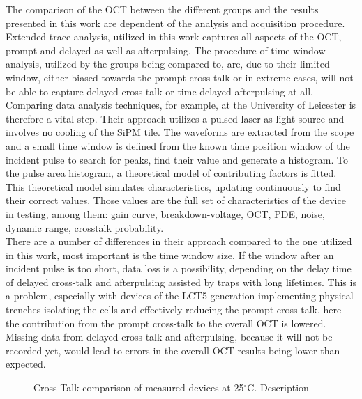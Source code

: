 \documentclass[12pt,article,type=msc,colorback,accentcolor=tud9c]{tudthesis}
\begin{document}
The comparison of the OCT between the different groups and the results presented in this work are dependent of the analysis and acquisition procedure. Extended trace analysis, utilized in this work captures all aspects of the OCT, prompt and delayed as well as afterpulsing. The procedure of time window analysis, utilized by the groups being compared to, are, due to their limited window, either biased towards the prompt cross talk or in extreme cases, will not be able to capture delayed cross talk or time-delayed afterpulsing at all. Comparing data analysis techniques, for example, at the University of Leicester is therefore a vital step. Their approach utilizes a pulsed laser as light source and involves no cooling of the SiPM tile. The waveforms are extracted from the scope and a small time window is defined from the known time position window of the incident pulse to search for peaks, find their value and generate a histogram. To the pulse area histogram, a theoretical model of contributing factors is fitted. This theoretical model simulates characteristics, updating continuously to find their correct values. Those values are the full set of characteristics of the device in testing, among them: gain curve, breakdown-voltage, OCT, PDE, noise, dynamic range, crosstalk probability.\\
There are a number of differences in their approach compared to the one utilized in this work, most important is the time window size. If the window after an incident pulse is too short, data loss is a possibility, depending on the delay time of delayed cross-talk and afterpulsing assisted by traps with long lifetimes. This is a problem, especially with devices of the LCT5 generation implementing physical trenches isolating the cells and effectively reducing the prompt cross-talk, here the contribution from the prompt cross-talk to the overall OCT is lowered. Missing data from delayed cross-talk and afterpulsing, because it will not be recorded yet, would lead to errors in the overall OCT results being lower than expected.\\


\begin{figure}[h]
\begin{centering}
\caption[OCT device comparison]{Cross Talk comparison of measured devices at 25$^\circ$C. Description}
\label{fig:DC_OCT}
\end{centering}
\end{figure}
\end{document}
